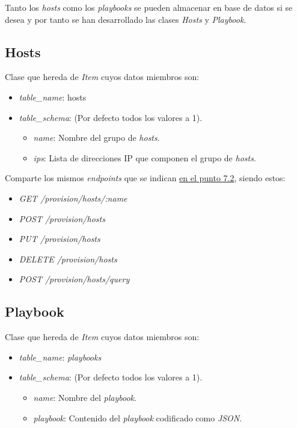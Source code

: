 Tanto los \textit{hosts} como los \textit{playbooks} se pueden almacenar en base de datos si se desea y por tanto se han desarrollado las clases \textit{Hosts} y \textit{Playbook}.



\subsection{Hosts}

Clase que hereda de \textit{Item} cuyos datos miembros son:
\begin{itemize}
	\item \textit{table\_name}: hosts
	\item \textit{table\_schema}: (Por defecto todos los valores a 1).
	\begin{itemize}
		\item \textit{name}: Nombre del grupo de \textit{hosts}.
		\item \textit{ips}: Lista de direcciones IP que componen el grupo de \textit{hosts}.
	\end{itemize}
\end{itemize}
	
\bigskip
Comparte los mismos \textit{endpoints} que se indican \hyperref[sec:servicios]{en el punto 7.2}, siendo estos:
\begin{itemize}
	\item \textit{GET /provision/hosts/:name}
	\item \textit{POST /provision/hosts}
	\item \textit{PUT /provision/hosts}
	\item \textit{DELETE /provision/hosts}
	\item \textit{POST /provision/hosts/query}
\end{itemize}


\subsection{Playbook}

Clase que hereda de \textit{Item} cuyos datos miembros son:
\begin{itemize}
	\item \textit{table\_name}: \textit{playbooks}
	\item \textit{table\_schema}: (Por defecto todos los valores a 1).
	\begin{itemize}
		\item \textit{name}: Nombre del \textit{playbook}.
		\item \textit{playbook}: Contenido del \textit{playbook} codificado como \textit{JSON}.
	\end{itemize}
\end{itemize}
	
